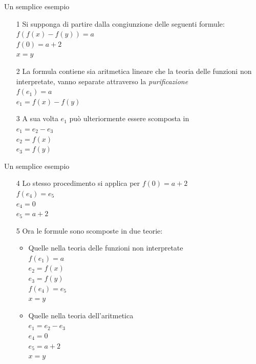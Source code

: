 \documentclass[]{beamer}
\begin{document}
\begin{frame}{Un semplice esempio \cite{SMTsolver_ex}}
\begin{example}
\begin{enumerate}
    \item[1] Si supponga di partire dalla congiunzione delle seguenti formule:\\
    $f(f(x)-f(y)) = a$\\
    $f(0)=a+2$\\
    $x = y$\\
    \item[2] La formula contiene sia aritmetica lineare che la teoria delle funzioni non interpretate, vanno separate attraverso la \textit{purificazione}\\
    $f(e_1)=a$\\
    $e_1 = f(x)-f(y)$
    \item[3] A sua volta $e_1$ può ulteriormente essere scomposta in\\
    $e_1 = e_2-e_3$\\
    $e_2 = f(x)$\\
    $e_3 = f(y)$
\end{enumerate}
\end{example}
\end{frame}

\begin{frame}{Un semplice esempio}
\begin{example}
    \begin{enumerate}
    \item[4] Lo stesso procedimento si applica per $f(0)=a+2$\\
    $f(e_4)=e_5$\\
    $e_4=0$\\
    $e_5=a+2$
    \item[5] Ora le formule sono scomposte in due teorie:\begin{itemize}
        \item Quelle nella teoria delle funzioni non interpretate\\
        $f(e_1)=a$\\
        $e_2=f(x)$\\
        $e_3=f(y)$\\
        $f(e_4)=e_5$\\
        $x=y$\\
        \item Quelle nella teoria dell'aritmetica\\
        $e_1=e_2-e_3$\\
        $e_4=0$\\
        $e_5=a+2$\\
        $x=y$
    \end{itemize} 
    \end{enumerate}
\end{example}
\end{frame}
\end{document}
